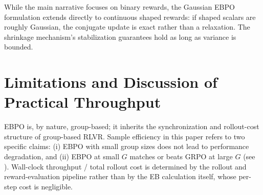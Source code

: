 \documentclass{article}
\theoremstyle{plain}
\theoremstyle{definition}
\theoremstyle{remark}
\begin{document}
While the main narrative focuses on binary rewards, the Gaussian EBPO formulation extends directly to continuous shaped rewards: if shaped scalars are roughly Gaussian, the conjugate update is exact rather than a relaxation. The shrinkage mechanism's stabilization guarantees hold as long as variance is bounded.

\section{Limitations and Discussion of Practical Throughput}
EBPO is, by nature, group-based; it inherits the synchronization and rollout-cost structure of group-based RLVR. Sample efficiency in this paper refers to two specific claims: (i) EBPO with small group sizes does not lead to performance degradation, and (ii) EBPO at small $G$ matches or beats GRPO at large $G$ (see ). Wall-clock throughput / total rollout cost is determined by the rollout and reward-evaluation pipeline rather than by the EB calculation itself, whose per-step cost is negligible.

\newpage

\end{document}
